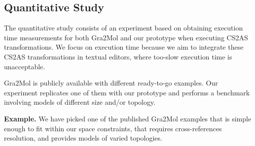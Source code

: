 \documentclass{llncs}
\begin{document}

\subsection{Quantitative Study}
\label{subsec:benchmark}

The quantitative study consists of an experiment based on obtaining execution time measurements for both Gra2Mol and our prototype when executing CS2AS transformations. We focus on execution time because we aim to integrate these CS2AS transformations in textual editors, where too-slow execution time is unacceptable.

Gra2Mol is publicly available with different ready-to-go examples. Our experiment replicates one of them with our prototype and performs a benchmark involving models of different size and/or topology.

\textbf{Example.} %
We have picked one of the published Gra2Mol examples that is simple enough to fit within our space constraints, that requires cross-references resolution, and provides models of varied topologies.
\end{document}
